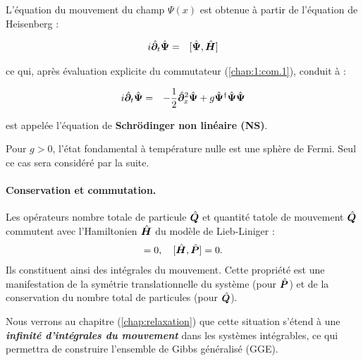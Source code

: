L’équation du mouvement du champ \( \Psi(x) \) est obtenue à partir de l’équation de Heisenberg :

\begin{eqnarray}
	i\hat{\bm{\partial}}_t	\hat{\bm{\Psi}} & = & [ \hat{\bm{\Psi}} , \hat{\bm{H}} ]
\end{eqnarray}

ce qui, après évaluation explicite du commutateur (\ref{chap:1:com.1}), conduit à :



\begin{eqnarray}
	i \hat{\bm{\partial}}_t \hat{\bm{\Psi}}	 & = & - \frac{1}{2}\hat{\bm{\partial}}_x^2 \hat{\bm{\Psi}} + g \hat{\bm{\Psi}}^\dag\hat{\bm{\Psi}} \hat{\bm{\Psi}}
\end{eqnarray}

est appelée l'équation de \textbf{Schrödinger non linéaire (NS)}.

Pour $g > 0$, l'état fondamental à température nulle est une sphère de Fermi. Seul ce cas sera considéré par la suite.


\paragraph{Conservation et commutation.}
Les opérateurs nombre totale de particule $\hat{\bm{Q}}$ et quantité tatole de mouvement  $\hat{\bm{Q}}$  commutent avec l’Hamiltonien $\hat{\bm{H}}$ du modèle de Lieb-Liniger :
\begin{eqnarray}
[ \operator{H} , \operator{Q} ] = 0, \quad [ \operator{H} , \operator{P} ] = 0.
\end{eqnarray}
Ils constituent ainsi des intégrales du mouvement. Cette propriété est une manifestation de la symétrie translationnelle du système (pour $\hat{\bm{P}}$) et de la conservation du nombre total de particules (pour $\hat{\bm{Q}}$).

\begin{mdframed}[
	linewidth=0.5pt, 
	backgroundcolor=gray!5, 
	roundcorner=50pt,	
	innerleftmargin=5pt,
    innerrightmargin=5pt,
    innertopmargin=5pt,
    innerbottommargin=2pt,
    leftmargin=2pt,
    rightmargin=2pt
	]
	Nous verrons au chapitre (\ref{chap:relaxation}) que cette situation s’étend à une {\bf \em infinité d’intégrales du mouvement} dans les systèmes intégrables, ce qui permettra de construire l’ensemble de Gibbs généralisé (GGE).
\end{mdframed}

